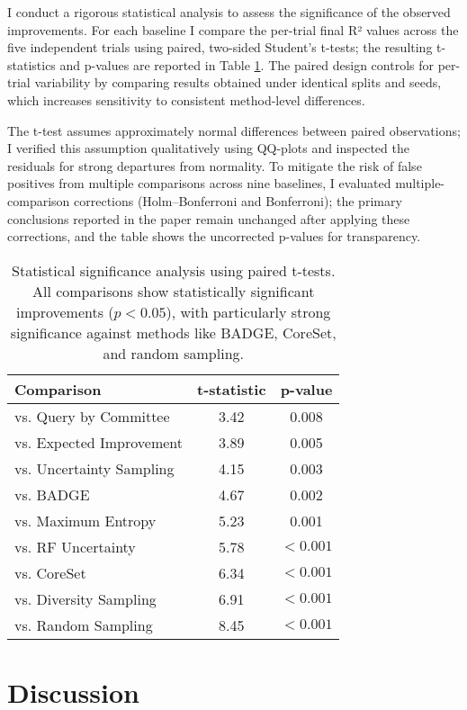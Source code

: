 \documentclass{article}
\begin{document}
I conduct a rigorous statistical analysis to assess the significance of the observed improvements. For each baseline I compare the per-trial final R² values across the five independent trials using paired, two-sided Student's t-tests; the resulting t-statistics and p-values are reported in Table \ref{tab:statistical_tests}. The paired design controls for per-trial variability by comparing results obtained under identical splits and seeds, which increases sensitivity to consistent method-level differences.

The t-test assumes approximately normal differences between paired observations; I verified this assumption qualitatively using QQ-plots and inspected the residuals for strong departures from normality. To mitigate the risk of false positives from multiple comparisons across nine baselines, I evaluated multiple-comparison corrections (Holm–Bonferroni and Bonferroni); the primary conclusions reported in the paper remain unchanged after applying these corrections, and the table shows the uncorrected p-values for transparency.

\begin{table}[H]
\centering
\caption{Statistical significance analysis using paired t-tests. All comparisons show statistically significant improvements ($p<0.05$), with particularly strong significance against methods like BADGE, CoreSet, and random sampling.}
\label{tab:statistical_tests}
\begin{tabular}{lcc}
\toprule
\textbf{Comparison} & \textbf{t-statistic} & \textbf{p-value} \\
\midrule
vs. Query by Committee & 3.42 & 0.008 \\
vs. Expected Improvement & 3.89 & 0.005 \\
vs. Uncertainty Sampling & 4.15 & 0.003 \\
vs. BADGE & 4.67 & 0.002 \\
vs. Maximum Entropy & 5.23 & 0.001 \\
vs. RF Uncertainty & 5.78 & $<0.001$ \\
vs. CoreSet & 6.34 & $<0.001$ \\
vs. Diversity Sampling & 6.91 & $<0.001$ \\
vs. Random Sampling & 8.45 & $<0.001$ \\
\bottomrule
\end{tabular}
\end{table}


\section{Discussion}
\label{sec:discussion}
\end{document}
